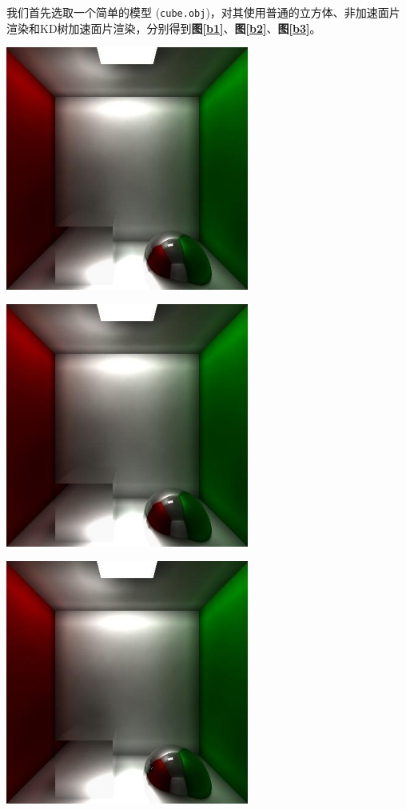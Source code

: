 \documentclass[11pt, a4paper]{article}
\makeatletter
\newcommand\fcaption{\def\@captype{figure}\caption}
\newcommand{\fref}[1]{\textbf{图\ref{#1}}}
\makeatother
\begin{document}
我们首先选取一个简单的模型 (\texttt{cube.obj})，对其使用普通的立方体、非加速面片渲染和KD树加速面片渲染，分别得到\fref{b1}、\fref{b2}、\fref{b3}。

\begin{center}
    \includegraphics[width=8cm]{../outputs/box.jpeg}
    \fcaption{Box (非模型)}\label{b1}
\end{center}

\begin{center}
    \includegraphics[width=8cm]{../outputs/box_model_slow.jpeg}
    \fcaption{Box (非加速模型)}\label{b2}
\end{center}

\begin{center}
    \includegraphics[width=8cm]{../outputs/box_model.jpeg}
    \fcaption{Box (加速模型)}\label{b3}
\end{center}
\end{document}
